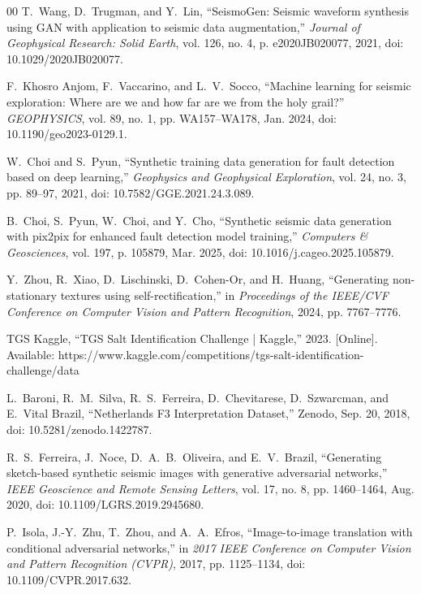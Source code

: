 \documentclass{ieeeaccess}
\begin{document}
\begin{thebibliography}{00}
T.~Wang, D.~Trugman, and Y.~Lin, ``SeismoGen: Seismic waveform synthesis using GAN with application to seismic data augmentation,'' \emph{Journal of Geophysical Research: Solid Earth}, vol. 126, no. 4, p. e2020JB020077, 2021, doi: 10.1029/2020JB020077.

F.~Khosro Anjom, F.~Vaccarino, and L.~V.~Socco, ``Machine learning for seismic exploration: Where are we and how far are we from the holy grail?'' \emph{GEOPHYSICS}, vol. 89, no. 1, pp. WA157--WA178, Jan. 2024, doi: 10.1190/geo2023-0129.1.

W.~Choi and S.~Pyun, ``Synthetic training data generation for fault detection based on deep learning,'' \emph{Geophysics and Geophysical Exploration}, vol. 24, no. 3, pp. 89--97, 2021, doi: 10.7582/GGE.2021.24.3.089.

B.~Choi, S.~Pyun, W.~Choi, and Y.~Cho, ``Synthetic seismic data generation with pix2pix for enhanced fault detection model training,'' \emph{Computers \& Geosciences}, vol. 197, p. 105879, Mar. 2025, doi: 10.1016/j.cageo.2025.105879.

Y.~Zhou, R.~Xiao, D.~Lischinski, D.~Cohen-Or, and H.~Huang, ``Generating non-stationary textures using self-rectification,'' in \emph{Proceedings of the IEEE/CVF Conference on Computer Vision and Pattern Recognition}, 2024, pp. 7767--7776.

TGS Kaggle, ``TGS Salt Identification Challenge | Kaggle,'' 2023. [Online]. Available: https://www.kaggle.com/competitions/tgs-salt-identification-challenge/data

L.~Baroni, R.~M.~Silva, R.~S.~Ferreira, D.~Chevitarese, D.~Szwarcman, and E.~Vital Brazil, ``Netherlands F3 Interpretation Dataset,'' Zenodo, Sep. 20, 2018, doi: 10.5281/zenodo.1422787.

R.~S.~Ferreira, J.~Noce, D.~A.~B.~Oliveira, and E.~V.~Brazil, ``Generating sketch-based synthetic seismic images with generative adversarial networks,'' \emph{IEEE Geoscience and Remote Sensing Letters}, vol. 17, no. 8, pp. 1460--1464, Aug. 2020, doi: 10.1109/LGRS.2019.2945680.

P.~Isola, J.-Y.~Zhu, T.~Zhou, and A.~A.~Efros, ``Image-to-image translation with conditional adversarial networks,'' in \emph{2017 IEEE Conference on Computer Vision and Pattern Recognition (CVPR)}, 2017, pp. 1125--1134, doi: 10.1109/CVPR.2017.632.


\end{thebibliography}
\end{document}
